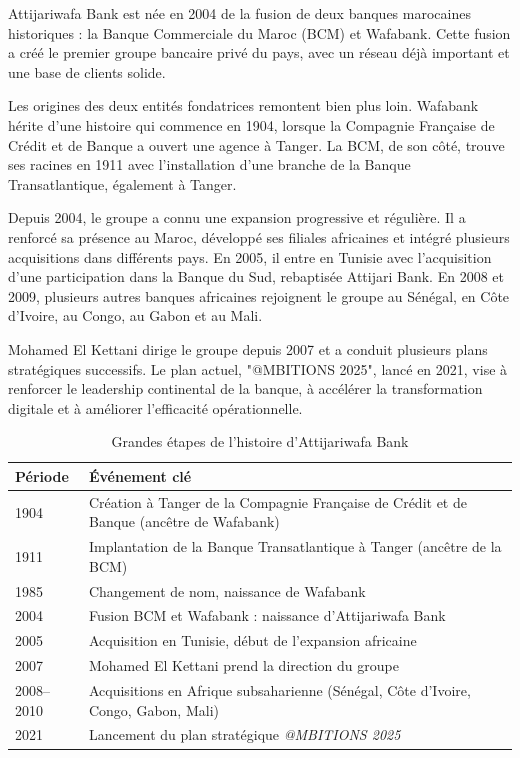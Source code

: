 \documentclass[11pt,a4paper,twoside]{report}
\begin{document}
Attijariwafa Bank est née en 2004 de la fusion de deux banques marocaines historiques : la Banque Commerciale du Maroc (BCM) et Wafabank. Cette fusion a créé le premier groupe bancaire privé du pays, avec un réseau déjà important et une base de clients solide.

Les origines des deux entités fondatrices remontent bien plus loin. Wafabank hérite d'une histoire qui commence en 1904, lorsque la Compagnie Française de Crédit et de Banque a ouvert une agence à Tanger. La BCM, de son côté, trouve ses racines en 1911 avec l'installation d'une branche de la Banque Transatlantique, également à Tanger.

Depuis 2004, le groupe a connu une expansion progressive et régulière. Il a renforcé sa présence au Maroc, développé ses filiales africaines et intégré plusieurs acquisitions dans différents pays. En 2005, il entre en Tunisie avec l'acquisition d'une participation dans la Banque du Sud, rebaptisée Attijari Bank. En 2008 et 2009, plusieurs autres banques africaines rejoignent le groupe au Sénégal, en Côte d'Ivoire, au Congo, au Gabon et au Mali.

Mohamed El Kettani dirige le groupe depuis 2007 et a conduit plusieurs plans stratégiques successifs. Le plan actuel, "@MBITIONS 2025", lancé en 2021, vise à renforcer le leadership continental de la banque, à accélérer la transformation digitale et à améliorer l'efficacité opérationnelle.

\begin{table}[H]
\centering
\small
\renewcommand{\arraystretch}{1.35}
\begin{tabular}{|p{2.5cm}|p{10cm}|}
\hline
\textbf{Période} & \textbf{Événement clé} \\
\hline
1904 & Création à Tanger de la Compagnie Française de Crédit et de Banque (ancêtre de Wafabank) \\
\hline
1911 & Implantation de la Banque Transatlantique à Tanger (ancêtre de la BCM) \\
\hline
1985 & Changement de nom, naissance de Wafabank \\
\hline
2004 & Fusion BCM et Wafabank : naissance d'Attijariwafa Bank \\
\hline
2005 & Acquisition en Tunisie, début de l'expansion africaine \\
\hline
2007 & Mohamed El Kettani prend la direction du groupe \\
\hline
2008--2010 & Acquisitions en Afrique subsaharienne (Sénégal, Côte d'Ivoire, Congo, Gabon, Mali) \\
\hline
2021 & Lancement du plan stratégique \textit{@MBITIONS 2025} \\
\hline
\end{tabular}
\caption{Grandes étapes de l'histoire d'Attijariwafa Bank}
\end{table}
\end{document}
